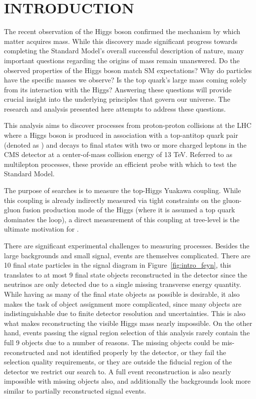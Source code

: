 %
%

\chapter{INTRODUCTION}
The recent observation of the Higgs boson confirmed the mechanism by which matter acquires mass. While this discovery made
significant progress towards completing the Standard Model's overall successful description of nature, many important questions
regarding the origins of mass remain unanswered. Do the observed properties of the Higgs boson match SM expectations? Why do
particles have the specific masses we observe? Is the top quark's large mass coming solely from its interaction with the Higgs?
Answering these questions will provide crucial insight into the underlying principles that govern our universe. The research and
analysis presented here attempts to address these questions. 

This analysis aims to discover processes from proton-proton collisions at the LHC where a Higgs boson is produced in association
with a top-antitop quark pair (denoted as \tth) and decays to final states with two or more charged leptons in the CMS detector
at a center-of-mass collision energy of 13 TeV.
Referred to as \tth multilepton processes, these provide an efficient probe with which to test the Standard Model. 

The purpose of \tth searches is to measure the top-Higgs Yuakawa coupling. While this coupling is already indirectly measured via tight constraints
on the gluon-gluon fusion production mode of the Higgs (where it is assumed a top quark dominates the loop), a direct measurement of this coupling
at tree-level is the ultimate motivation for \tth. 

There are significant experimental challenges to measuring \tth processes. Besides the large backgrounds and small signal, \tth events are themselves
complicated. There are 10 final state particles in the signal diagram in Figure~\ref{fig:intro_feyn}, this translates to at most 9 final state objects
reconstructed in the detector since the neutrinos are only detected due to a single missing transverse energy quantity. While having as many of the final
state objects as possible is desirable, it also makes the task of object assignment more complicated, since many objects are indistinguishable due to
finite detector resolution and uncertainties. This is also what makes reconstructing the visible Higgs mass nearly impossible. On the other hand,
events passing the signal region selection of this analysis rarely contain the full 9 objects due to a number of reasons. The missing objects could be mis-reconstructed
and not identified properly by the detector, or they fail the selection quality requirements, or they are outside the fiducial region of the detector
we restrict our search to. A full event reconstruction is also nearly impossible with missing objects also, and additionally the backgrounds look more similar
to partially reconstructed \tth signal events. 


